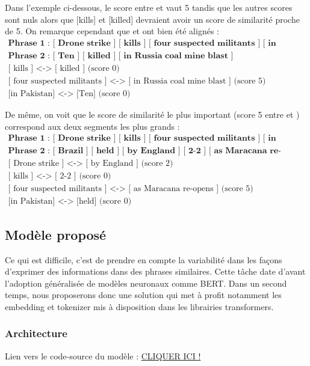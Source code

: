 \documentclass[a4paper, twoside, 11pt]{article}
\begin{document}
Dans l'exemple ci-dessous, le score entre  \fg{} et   \fg{} vaut 5 tandis que les autres scores sont nuls alors que [kills] et [killed] devraient avoir un score de similarité proche de 5. On remarque cependant que \og [ kills ] \fg{} et \og [ killed ] \fg{} ont bien été alignés :
\begin{eqnarray*}
\textbf{Phrase 1 : [ Drone strike ] [ kills ] [ four suspected militants ] [ in Pakistan ]}\\
\textbf{Phrase 2 : [ Ten ] [ killed ] [ in Russia coal mine blast ]}\\
\textrm{[ kills ] <-> [ killed ] (score 0)}\\
\textrm{[ four suspected militants ] <-> [ in Russia coal mine blast ] (score 5)}\\
\textrm{[in Pakistan] <-> [Ten] (score 0)}
\end{eqnarray*}


De même, on voit que le score de similarité le plus important (score 5 entre  \fg{} et \fg{}) correspond aux deux segments les plus grands :
\begin{eqnarray*}
\textbf{Phrase 1 : [ Drone strike ] [ kills ] [ four suspected militants ] [ in Pakistan ]}\\
\textbf{Phrase 2 : [ Brazil ] [ held ] [ by England ] [ 2-2 ] [ as Maracana re-opens ]}\\
\textrm{[ Drone strike ] <-> [ by England ] (score 2)}\\
\textrm{[ kills ] <-> [ 2-2 ] (score 0)}\\
\textrm{[ four suspected militants ] <-> [ as Maracana re-opens ] (score 5)}\\
\textrm{[in Pakistan] <-> [held] (score 0)}
\end{eqnarray*}

    \subsection{Modèle proposé}
     Ce qui est difficile, c’est de prendre en compte la variabilité dans les façons d’exprimer des informations dans des phrases similaires. Cette tâche date d’avant l’adoption généralisée de modèles neuronaux comme BERT. Dans un second temps, nous proposerons donc une solution qui met à profit notamment les embedding et tokenizer mis à disposition dans les librairies transformers.

 \subsubsection{Architecture}
 Lien vers le code-source du modèle : \href{https://github.com/timfronteau/Semantic_chunk_identification}{CLIQUER ICI !}
\end{document}
